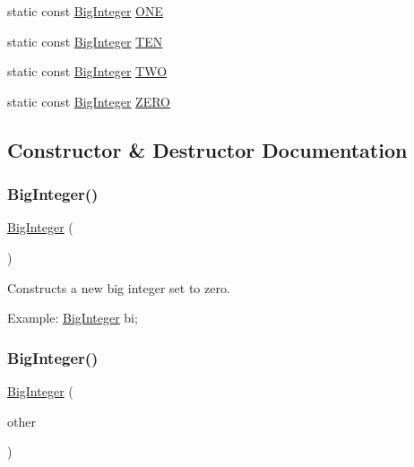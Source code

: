 \begin{DoxyCompactItemize}
static const \mbox{\hyperlink{classBigInteger}{Big\+Integer}} \mbox{\hyperlink{classBigInteger_ab4699c19ec258ec72040ec18a7091282}{O\+NE}}
\item 
static const \mbox{\hyperlink{classBigInteger}{Big\+Integer}} \mbox{\hyperlink{classBigInteger_a4ba3620629ec7cd6672198f07ca23a39}{T\+EN}}
\item 
static const \mbox{\hyperlink{classBigInteger}{Big\+Integer}} \mbox{\hyperlink{classBigInteger_ac39750ccb95f4daaf9fc095f5cdac33d}{T\+WO}}
\item 
static const \mbox{\hyperlink{classBigInteger}{Big\+Integer}} \mbox{\hyperlink{classBigInteger_a9ffc8471ab0e5bfe12128dca249d965b}{Z\+E\+RO}}
\end{DoxyCompactItemize}


\subsection{Constructor \& Destructor Documentation}
\mbox{\label{classBigInteger_a49b951f4a6687820741740806aa04715}} 
\subsubsection{\texorpdfstring{Big\+Integer()}{BigInteger()}\hspace{0.1cm}{\footnotesize\ttfamily [1/4]}}
{\footnotesize\ttfamily \mbox{\hyperlink{classBigInteger}{Big\+Integer}} (\begin{DoxyParamCaption}{ }\end{DoxyParamCaption})}



Constructs a new big integer set to zero. 

Example\+: \mbox{\hyperlink{classBigInteger}{Big\+Integer}} bi; \mbox{\label{classBigInteger_a2b2f122dc8513adcbf68d8b329834c9a}} 
\subsubsection{\texorpdfstring{Big\+Integer()}{BigInteger()}\hspace{0.1cm}{\footnotesize\ttfamily [2/4]}}
{\footnotesize\ttfamily \mbox{\hyperlink{classBigInteger}{Big\+Integer}} (\begin{DoxyParamCaption}\item[{const \mbox{\hyperlink{classBigInteger}{Big\+Integer}} \&}]{other }\end{DoxyParamCaption})}



